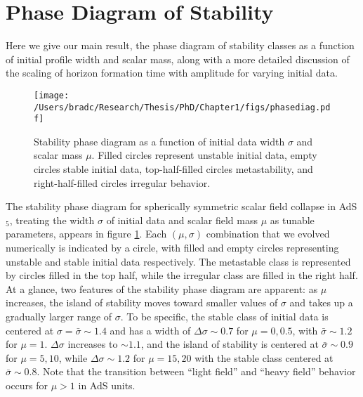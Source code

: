 \documentclass[../PhD.tex]{subfiles}
\begin{document}

\section{Phase Diagram of Stability}\label{s:phases}
Here we give our main result, the phase diagram of stability classes
as a function of initial profile width and scalar mass, along with a
more detailed discussion of the scaling of horizon formation time with
amplitude for varying initial data.

\begin{figure}[!t]
\centering
\texttt{[image: /Users/bradc/Research/Thesis/PhD/Chapter1/figs/phasediag.pdf]}
\caption[Stability phase diagram]{Stability phase diagram as a function of initial data width 
$\sigma$ and scalar mass $\mu$.  Filled circles represent unstable initial 
data, empty circles stable initial data, top-half-filled circles 
metastability, and right-half-filled circles irregular behavior.}
\label{f:phase}
\end{figure}

The stability phase diagram for spherically
symmetric scalar field collapse in AdS$_5$, treating the width $\sigma$
of initial data and scalar field mass $\mu$ as tunable parameters,
appears in figure \ref{f:phase}.  Each $(\mu,\sigma)$ combination that
we evolved numerically is indicated by a circle, with filled and empty
circles representing unstable and stable initial data respectively.  The
metastable class is represented by circles filled in the top half, while
the irregular class are filled in the right half.  At a glance, two features
of the stability phase diagram are apparent: as $\mu$ increases, the island
of stability moves toward smaller values of $\sigma$ and takes up a
gradually larger range of $\sigma$.  To be specific, the stable class of initial
data is centered at $\sigma=\bar\sigma\sim 1.4$ and has a width of
$\Delta\sigma\sim 0.7$ for $\mu=0,0.5$, with $\bar\sigma\sim 1.2$ for $\mu=1$.
$\Delta\sigma$ increases to $\sim 1.1$, and the island of
stability is centered at
$\bar\sigma\sim 0.9$ for $\mu=5,10$, while $\Delta\sigma\sim 1.2$
for $\mu=15,20$ with the stable class centered at $\bar\sigma\sim 0.8$.
Note that the transition between ``light field'' and ``heavy field'' 
behavior occurs for $\mu>1$ in AdS units.
\end{document}
